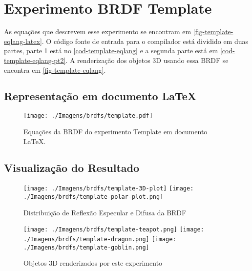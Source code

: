 \section{Experimento BRDF Template}

As equações que descrevem esse experimento se encontram em \autoref{fig-template-eqlang-latex}. O código fonte de entrada para o compilador está dividido em duas partes, parte 1 está no \autoref{cod-template-eqlang} e a segunda parte está em \autoref{cod-template-eqlang-pt2}. A renderização dos objetos 3D usando essa BRDF se encontra em \autoref{fig-template-eqlang}.

\subsection{Representação em documento \LaTeX{}}
\begin{figure}[H]
    \caption{\label{fig-template-eqlang-latex} \small Equações da BRDF do experimento Template em documento \LaTeX{}.}
    \begin{center}
        \texttt{[image: ./Imagens/brdfs/template.pdf]}
    \end{center}
\end{figure}

\subsection{Visualização do Resultado}
\begin{figure}[H]
    \caption{\small{Distribuição de Reflexão Especular e Difusa da BRDF}}\label{fig-template-eqlang}
    \vspace{42px}
  \texttt{[image: ./Imagens/brdfs/template-3D-plot]}
\endminipage\hfill
{}
  \texttt{[image: ./Imagens/brdfs/template-polar-plot.png]}
\endminipage\hfill
\end{figure}

\begin{figure}[H]
    \caption{\small{Objetos 3D renderizados por este experimento}}\label{fig-template-eqlang}
  \texttt{[image: ./Imagens/brdfs/template-teapot.png]}
\endminipage\hfill
{}
  \texttt{[image: ./Imagens/brdfs/template-dragon.png]}
\endminipage\hfill
{}%
  \texttt{[image: ./Imagens/brdfs/template-goblin.png]}
\endminipage
\end{figure}

